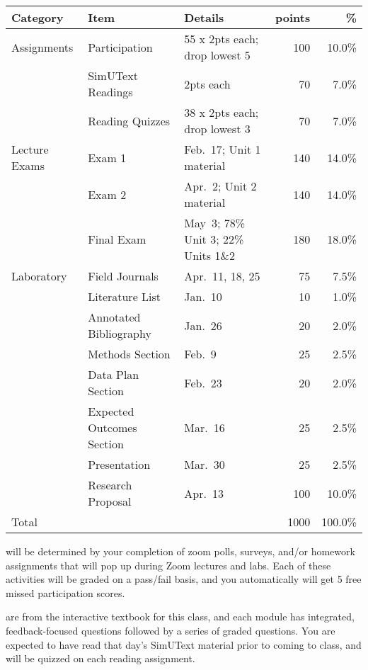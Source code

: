 \documentclass{tufte-handout}
\begin{document}
\begin{fullwidth}

\begin{table}
\begin{tabular}{l l l r r}
Category & Item & Details & points & \% \\
\hline
Assignments & Participation & 55 x 2pts each; drop lowest 5 & 100 & 10.0\% \\
& SimUText Readings   & 2pts each & 70 & 7.0\% \\
& Reading Quizzes  & 38 x 2pts each; drop lowest 3 & 70 & 7.0\% \\
\hline
Lecture Exams & Exam 1 & Feb.~17; Unit 1 material & 140 & 14.0\% \\
& Exam 2 & Apr.~2; Unit 2 material & 140 & 14.0\% \\
& Final Exam & May~3; 78\% Unit 3; 22\% Units 1\&2 & 180 & 18.0\% \\ 		
\hline
Laboratory & Field Journals & Apr.~11, 18, 25 & 75 & 7.5\% \\
& Literature List & Jan.~10 & 10 & 1.0\% \\
& Annotated Bibliography & Jan.~26 & 20 & 2.0\% \\
& Methods Section & Feb.~9 & 25 & 2.5\% \\
& Data Plan Section & Feb.~23 & 20 & 2.0\% \\
& Expected Outcomes Section & Mar.~16 & 25 & 2.5\% \\
& Presentation & Mar.~30 & 25 & 2.5\% \\
& Research Proposal & Apr.~13 & 100 & 10.0\% \\
\hline
Total & & & 1000 & 100.0\% 
\end{tabular}
\end{table}




 will be determined by your completion of zoom polls, surveys, and/or homework assignments that will pop up during Zoom lectures and labs. Each of these activities will be graded on a pass/fail basis, and you automatically will get 5 free missed participation scores. 



 are from the interactive textbook for this class, and each module has integrated, feedback-focused questions followed by a series of graded questions. \color{blue}You are expected to have read that day's SimUText material prior to coming to class, and will be quizzed on each reading assignment. \color{black} 

\end{fullwidth}
\end{document}

